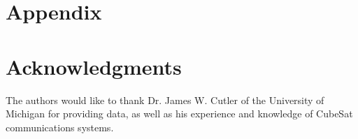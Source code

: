 \documentclass[conf]{new-aiaa}
\begin{document}
\section*{Appendix}


\section*{Acknowledgments}

The authors would like to thank Dr. James W. Cutler of the University of Michigan for providing data, as well as his experience and knowledge of CubeSat communications systems.


\end{document}

